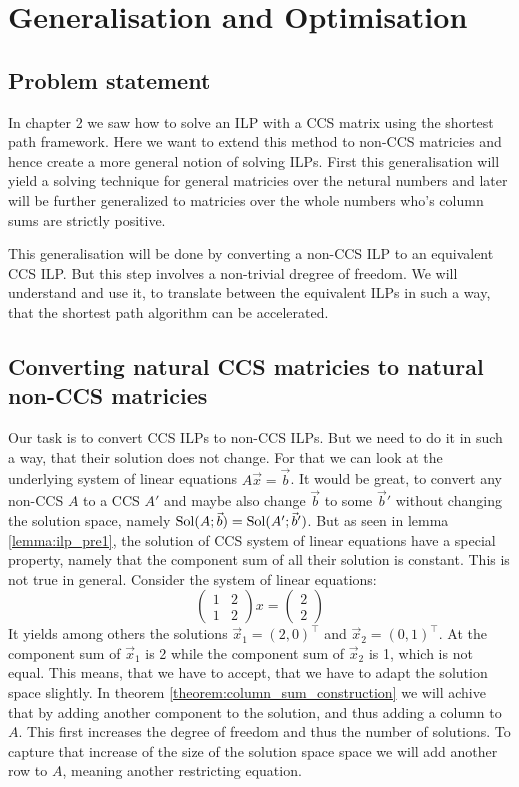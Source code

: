 \chapter{Generalisation and Optimisation}
\section{Problem statement}
In chapter 2 we saw how to solve an ILP with a CCS matrix using the shortest path framework. Here we want to extend this method to non-CCS matricies and hence create a more general notion of solving ILPs. First this generalisation will yield a solving technique for general matricies over the netural numbers and later will be further generalized to matricies over the whole numbers who's column sums are strictly positive. 

This generalisation will be done by converting a non-CCS ILP to an equivalent CCS ILP. But this step involves a non-trivial dregree of freedom. We will understand and use it, to translate between the equivalent ILPs in such a way, that the shortest path algorithm can be accelerated. 

\section{Converting natural CCS matricies to natural non-CCS matricies}
Our task is to convert CCS ILPs to non-CCS ILPs. But we need to do it in such a way, that their solution does not change. For that we can look at the underlying system of linear equations $A\vec x = \vec b$. It would be great, to convert any non-CCS $A$ to a CCS $A'$ and maybe also change $\vec b$ to some $\vec b'$ without changing the solution space, namely $\operatorname{Sol}(A;\vec b) = \operatorname{Sol}(A';\vec b')$. But as seen in lemma \ref{lemma:ilp_pre1}, the solution of CCS system of linear equations have a special property, namely that the component sum of all their solution is constant. This is not true in general. Consider the system of linear equations:
$$
\left(\begin{matrix}
    1 & 2\\
    1 & 2
\end{matrix}\right)
x = \left(\begin{matrix}
    2\\2
\end{matrix}\right)
$$
It yields among others the solutions $\vec x_1 = (2, 0)^\top$ and $\vec x_2 = (0, 1)^\top$. At the component sum of $\vec x_1$ is 2 while the component sum of $\vec x_2$ is 1, which is not equal. This means, that we have to accept, that we have to adapt the solution space slightly. In theorem \ref{theorem:column_sum_construction} we will achive that by adding another component to the solution, and thus adding a column to $A$. This first increases the degree of freedom and thus the number of solutions. To capture that increase of the size of the solution space space we will add another row to $A$, meaning another restricting equation. 

